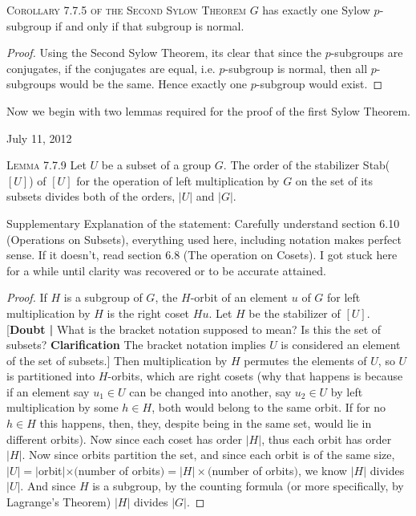 \documentclass[12pt]{article}
\begin{document}
\par
\textsc {Corollary 7.7.5 {\small of the Second Sylow Theorem }} $G$ has exactly one Sylow $p$-subgroup if and only if that subgroup is normal.
\begin{proof}
Using the Second Sylow Theorem, its clear that since the $p$-subgroups are conjugates, if the conjugates are equal, i.e. $p$-subgroup is normal, then all $p$-subgroups would be the same. Hence exactly one $p$-subgroup would exist.
\end{proof}
\par
Now we begin with two lemmas required for the proof of the first Sylow Theorem.
\par
\begin{flushright} {\small July 11, 2012} \end{flushright}
\textsc {Lemma 7.7.9} Let $U$ be a subset of a group $G$. The order of the stabilizer Stab($[U]$) of $[U]$ for the operation of left multiplication by $G$ on the set of its subsets divides both of the orders, $|U|$ and $|G|$.
\par
Supplementary Explanation of the statement: Carefully understand section 6.10 (Operations on Subsets), everything used here, including notation makes perfect sense. If it doesn't, read section 6.8 (The operation on Cosets). I got stuck here for a while until clarity was recovered or to be accurate attained.
\begin{proof}
If $H$ is a subgroup of $G$, the $H$-orbit of an element $u$ of $G$ for left multiplication by $H$ is the right coset $Hu$. Let $H$ be the stabilizer of $[U]$. [{\bf Doubt |} What is the bracket notation supposed to mean? Is this the set of subsets? {\bf Clarification} The bracket notation implies $U$ is considered an element of the set of subsets.] Then multiplication by $H$ permutes the elements of $U$, so $U$ is partitioned into $H$-orbits, which are right cosets (why that happens is because if an element say $u_{1} \in U$ can be changed into another, say $u_{2} \in U$ by left multiplication by some $h \in H$, both would belong to the same orbit. If for no $h \in H$ this happens, then, they, despite being in the same set, would lie in different orbits). Now since each coset has order $|H|$, thus each orbit has order $|H|$. Now since orbits partition the set, and since each orbit is of the same size, $|U|=|$orbit$|\times ($number of orbits$)=|H|\times($number of orbits$)$, we know $|H|$ divides $|U|$. And since $H$ is a subgroup, by the counting formula (or more specifically, by Lagrange's Theorem) $|H|$ divides $|G|$.
\end{proof}
\end{document}
